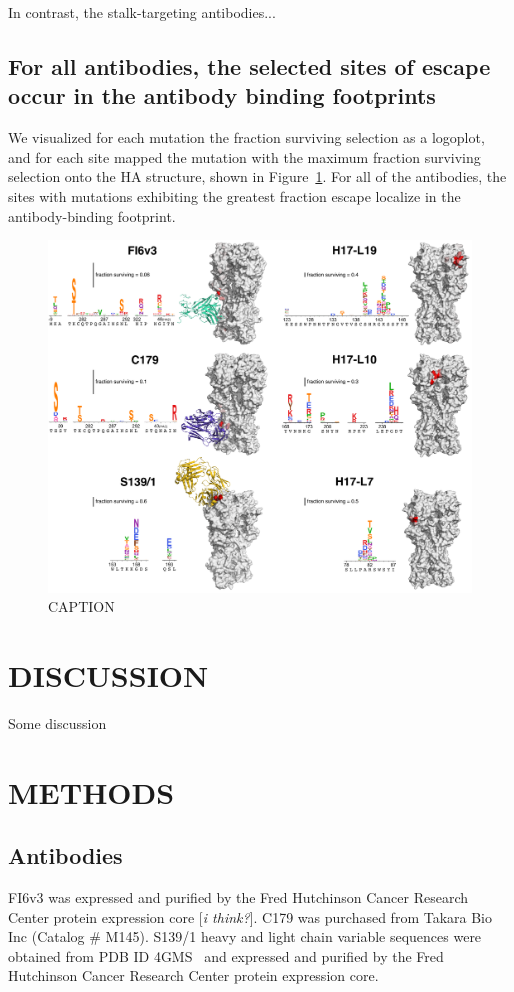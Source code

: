 \documentclass[11pt]{article}
\newcommand{\comment}[1]{{\color{red}[\textsl{#1}]}}
\begin{document}
In contrast, the stalk-targeting antibodies...

\subsection*{For all antibodies, the selected sites of escape occur in the antibody binding footprints}
We visualized for each mutation the fraction surviving selection as a logoplot, and for each site mapped the mutation with the maximum fraction surviving selection onto the HA structure, shown in Figure~\ref{fig:structures}. 
For all of the antibodies, the sites with mutations exhibiting the greatest fraction escape localize in the antibody-binding footprint.

\begin{figure}
\centerline{\includegraphics[width=\textwidth]{figs/logoplots_pymol/logoplots_pymol.pdf}}
\caption{
\label{fig:structures}
CAPTION
}
\end{figure}

\section*{DISCUSSION}
Some discussion

\clearpage
\small

\section*{METHODS}
\label{sec:methods}
\subsection*{Antibodies}
FI6v3 was expressed and purified by the Fred Hutchinson Cancer Research Center protein expression core \comment{i think?}.
C179 was purchased from Takara Bio Inc (Catalog \# M145).
S139/1 heavy and light chain variable sequences were obtained from PDB ID 4GMS~\cite{lee2012heterosubtypic} and expressed and purified by the Fred Hutchinson Cancer Research Center protein expression core.
\end{document}
